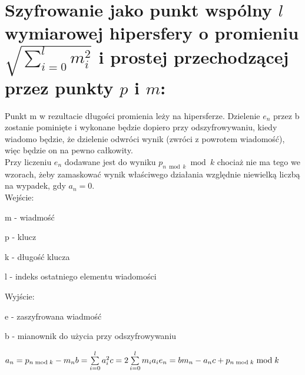 \documentclass[11pt]{article}
\begin{document}
	\section{
	Szyfrowanie jako punkt wspólny \ensuremath{l} wymiarowej hipersfery o promieniu\ensuremath{\sqrt{\sum\limits_{i=0}^l m^2_i}} i prostej przechodzącej przez punkty \ensuremath{p} i \ensuremath{m}:
	}
	Punkt m w rezultacie długości promienia leży na hipersferze.
	Dzielenie \ensuremath{e_n} przez b zostanie pominięte i wykonane będzie dopiero przy odszyfrowywaniu, kiedy wiadomo będzie, że dzielenie odwróci wynik (zwróci z powrotem wiadomość), więc będzie on na pewno całkowity.\\
	Przy liczeniu \ensuremath{e_n} dodawane jest do wyniku \ensuremath{p_{n\bmod{k}}\bmod{k}} chociaż nie ma tego we wzorach, żeby zamaskować wynik właściwego działania względnie niewielką liczbą na wypadek, gdy \ensuremath{a_n = 0}.\\
	Wejście:
	\begin{description}
	\item m - wiadmość
	\item p - klucz
	\item k - długość klucza
	\item l - indeks ostatniego elementu wiadomości
	\end{description}
	Wyjście:
	\begin{description}
	\item e - zaszyfrowana wiadmość
	\item b - mianownik do użycia przy odszyfrowywaniu
	\end{description} 
	\ensuremath {
		a_n = p_{n \bmod{k}} - m_n \\
		b = \sum\limits_{i=0}^l a_i^2 \\
		c = 2\sum\limits_{i=0}^l m_ia_i \\
		e_n = bm_n - a_nc + p_{n\bmod{k}}\bmod{k}
	}
	\newpage
\end{document}
